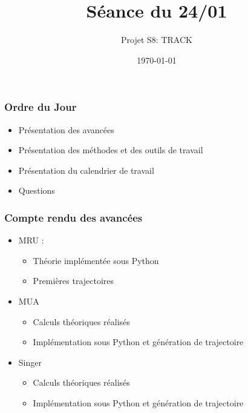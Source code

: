 \documentclass{beamer}
\title{Séance du 24/01}
\author{Projet S8: TRACK}
\institute[T2, Enseirb-Matmeca]{Département Télécommunication\\Enseirb-Matmeca, Bordeaux}
\date{\today}
\begin{document}
\begin{frame}
  \titlepage
\end{frame}

\begin{frame}
  \frametitle{Ordre du Jour}
  \begin{itemize}
    \item Présentation des avancées
    \item Présentation des méthodes et des outils de travail
    \item Présentation du calendrier de travail
    \item Questions 
  \end{itemize}
\end{frame}

\begin{frame}
  \frametitle{Compte rendu des avancées}
  \begin{itemize}
    \item MRU :
    \begin{itemize}
        \item[\hspace{1cm}] Théorie implémentée sous Python
        \item[\hspace{1cm}] Premières trajectoires 
    \end{itemize}
    \item MUA
    \begin{itemize}
        \item[\hspace{1cm}] Calculs théoriques réalisés
        \item[\hspace{1cm}] Implémentation sous Python et génération de trajectoire
    \end{itemize}
    \item Singer
    \begin{itemize}
        \item[\hspace{1cm}] Calculs théoriques réalisés
        \item[\hspace{1cm}] Implémentation sous Python et génération de trajectoire
    \end{itemize}
  \end{itemize}
\end{frame}
\end{document}
